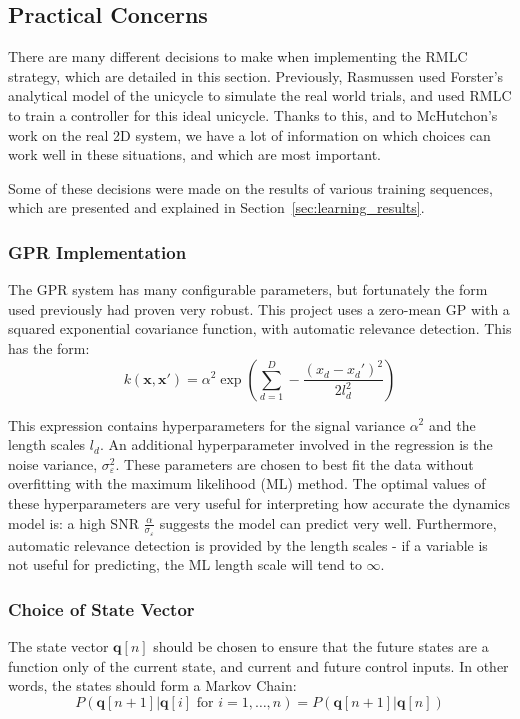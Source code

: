 \documentclass{IIBproject}
\begin{document}
\subsection{Practical Concerns}

There are many different decisions to make when implementing the RMLC
strategy, which are detailed in this section. Previously, Rasmussen used
Forster's analytical model of the unicycle to simulate the real world trials,
and used RMLC to train a controller for this ideal unicycle. Thanks to this,
and to McHutchon's work on the real 2D system, we have a lot of information on
which choices can work well in these situations, and which are most important.

Some of these decisions were made on the results of various training
sequences, which are presented and explained in
Section~\ref{sec:learning_results}.

\subsubsection{GPR Implementation}
The GPR system has many configurable parameters, but fortunately the form used
previously had proven very robust. This project uses a zero-mean GP with a
squared exponential covariance function, with automatic relevance detection.
This has the form:
\[
  k(\boldsymbol{x}, \boldsymbol{x}') = \alpha^2 \exp \left(\sum_{d=1}^D -
  \frac{(x_d-x_d')^2}{2 l_d^2}\right)
\]

This expression contains hyperparameters for the signal variance $\alpha^2$
and the length scales $l_d$. An additional hyperparameter involved in the
regression is the noise variance, $\sigma_\varepsilon^2$. These parameters are
chosen to best fit the data without overfitting with the maximum likelihood
(ML) method\cite{ref:gpml}. The optimal values of these hyperparameters are
very useful for interpreting how accurate the dynamics model is: a high SNR
$\frac{\alpha}{\sigma_\varepsilon}$ suggests the model can predict very
well.  Furthermore, automatic relevance detection is provided by the length
scales - if a variable is not useful for predicting, the ML length scale will
tend to $\infty$.

\subsubsection{Choice of State Vector}
\label{sec:state_vector}

The state vector $\boldsymbol{q}[n]$ should be chosen to ensure that the
future states are a function only of the current state, and current and future
control inputs. In other words, the states should form a Markov Chain:
\[
  P(\boldsymbol{q}[n+1] | \boldsymbol{q}[i]\textrm{ for } i = 1, \dots, n)
  = P(\boldsymbol{q}[n+1] | \boldsymbol{q}[n])
\]
\end{document}
